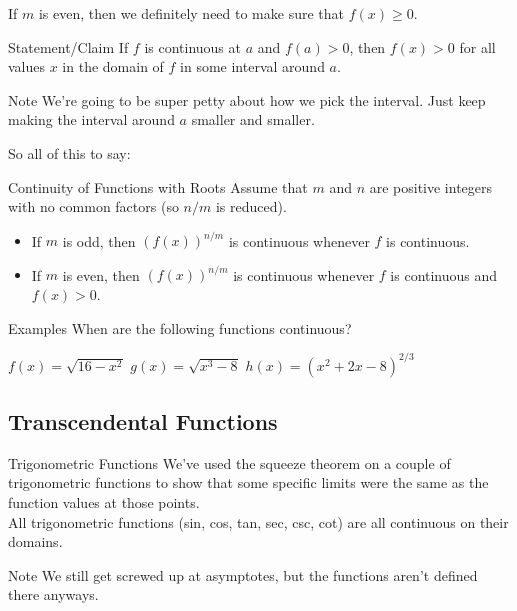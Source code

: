 If $m$ is even, then we definitely need to make sure that $f(x)\geq 0$.

\begin{thm}{Statement/Claim}
If $f$ is continuous at $a$ and $f(a)>0$, then $f(x)>0$ for all values $x$ in the domain of $f$ in some interval around $a$.
\end{thm}

\begin{note}{Note}
We're going to be super petty about how we pick the interval. Just keep making the interval around $a$ smaller and smaller.
\end{note}

So all of this to say:

\begin{thm}{Continuity of Functions with Roots}
Assume that $m$ and $n$ are positive integers with no common factors (so $n/m$ is reduced).
\begin{itemize}
  \item If $m$ is odd, then $(f(x))^{n/m}$ is continuous whenever $f$ is continuous.
  \item If $m$ is even, then $(f(x))^{n/m}$ is continuous whenever $f$ is continuous and $f(x)>0$.
\end{itemize}
\end{thm}

\begin{note}{Examples}
When are the following functions continuous?

$f(x)=\sqrt{16-x^2}$ \quad $g(x) = \sqrt{x^3-8}$ \quad $h(x) = (x^2+2x-8)^{2/3}$
\end{note}

\subsection*{Transcendental Functions}

\begin{defn}{Trigonometric Functions}
We've used the squeeze theorem on a couple of trigonometric functions to show that some specific limits were the same as the function values at those points.\\

All trigonometric functions (sin, cos, tan, sec, csc, cot) are all continuous on their domains.
\begin{note}{Note}
We still get screwed up at asymptotes, but the functions aren't defined there anyways.
\end{note}
\end{defn}

